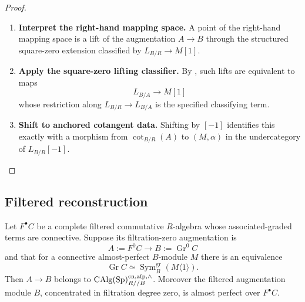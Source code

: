 \begin{proof}
\leavevmode
\begin{enumerate}[label=\textup{(\arabic*)}]
    \item \textbf{Interpret the right-hand mapping space.}
    A point of the right-hand mapping space is a lift of the augmentation
    \(A\to B\) through the structured square-zero extension classified by
    \(L_{B/R}\to M[1]\).
    \item \textbf{Apply the square-zero lifting classifier.}
    By
    , such lifts are equivalent to maps
    \[
        L_{B/A}\longrightarrow M[1]
    \]
    whose restriction along \(L_{B/R}\to L_{B/A}\) is the specified classifying
    term.
    \item \textbf{Shift to anchored cotangent data.}
    Shifting by \([-1]\) identifies this exactly with a morphism from
    \(\operatorname{cot}_{B/R}(A)\) to \((M,\alpha)\) in the undercategory of
    \(L_{B/R}[-1]\).
\end{enumerate}
\end{proof}

\subsection{Filtered reconstruction}

\begin{lemma}
\label{lem:filtered-reconstruction-complete-aft}
Let \(F^\bullet C\) be a complete filtered commutative \(R\)-algebra whose
associated-graded terms are connective. Suppose its filtration-zero augmentation
is
\[
    A:=F^0C\longrightarrow B:=\operatorname{Gr}^0C
\]
and that for a connective almost-perfect \(B\)-module \(M\) there is an
equivalence
\[
    \operatorname{Gr}C
    \simeq
    \operatorname{Sym}^{\mathrm{gr}}_B(M\langle1\rangle).
\]
Then \(A\to B\) belongs to
\(\operatorname{CAlg}(\operatorname{Sp})^{\mathrm{cn},\mathrm{afp},\wedge}_{R//B}\). Moreover the filtered augmentation
module \(B\), concentrated in filtration degree zero, is almost perfect over
\(F^\bullet C\).
\end{lemma}

